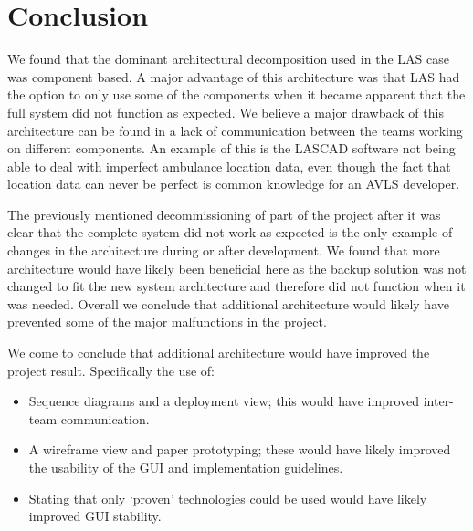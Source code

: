 \section*{Conclusion}

We found that the dominant architectural decomposition used in the LAS case was component based.
A major advantage of this architecture was that LAS had the option to only use some of the components when it became apparent that the full system did not function as expected.
We believe a major drawback of this architecture can be found in a lack of communication between the teams working on different components.
An example of this is the LASCAD software not being able to deal with imperfect ambulance location data,
even though the fact that location data can never be perfect is common knowledge for an AVLS developer.

The previously mentioned decommissioning of part of the project after it was clear that the complete system did not work as expected is the only example of changes in the architecture during or after development.
We found that more architecture would have likely been beneficial here as the backup solution was not changed to fit the new system architecture and therefore did not function when it was needed.
Overall we conclude that additional architecture would likely have prevented some of the major malfunctions in the project.

We come to conclude that additional architecture would have improved the project result.
Specifically the use of:
\begin{itemize}[noitemsep]
\item Sequence diagrams and a deployment view; this would have improved inter-team communication.
\item A wireframe view and paper prototyping; these would have likely improved the usability of the GUI and implementation guidelines.
\item Stating that only ‘proven’ technologies could be used would have likely improved GUI stability.
\end{itemize}

